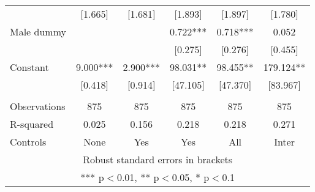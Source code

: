 \begin{tabular}{lccccc}
 & [1.665] & [1.681] & [1.893] & [1.897] & [1.780] \\
Male dummy &  &  & 0.722*** & 0.718*** & 0.052 \\
 &  &  & [0.275] & [0.276] & [0.455] \\
Constant & 9.000*** & 2.900*** & 98.031** & 98.455** & 179.124** \\
 & [0.418] & [0.914] & [47.105] & [47.370] & [83.967] \\
 &  &  &  &  &  \\
Observations & 875 & 875 & 875 & 875 & 875 \\
R-squared & 0.025 & 0.156 & 0.218 & 0.218 & 0.271 \\
 Controls & None & Yes & Yes & All & Inter \\ \hline
\multicolumn{6}{c}{ Robust standard errors in brackets} \\
\multicolumn{6}{c}{ *** p$<$0.01, ** p$<$0.05, * p$<$0.1} \\
\end{tabular}
